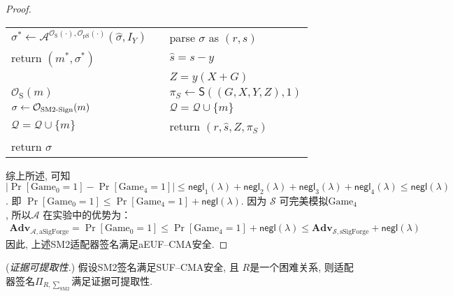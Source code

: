 \documentclass[review]{jcr}
\begin{document}
\begin{proof}
\begin{center}
{\begin{tabular}{lll}
$\sigma^*\leftarrow \mathcal{A}^{\mathcal{O}_{\text{S}}(\cdot),\mathcal{O}_{\text{pS}}(\cdot)}(\hat{\sigma},I_Y)$ &   &  parse $\sigma$ as $(r,s)$ \\

return $(m^*, \sigma^*)$ &   & $\hat{s}=s-y$  \\

 &   &  $Z=y(X+G)$ \\

$\mathcal{O}_{\text{S}}(m)$ &   &  $\pi_S\leftarrow \mathsf{S}((G,X,Y,Z),1)$ \\
\cline{1-1}

$\sigma\leftarrow \mathcal{O}_{\text{SM2\text{-}Sign}}(m)$ &   &  $\mathcal{Q}=\mathcal{Q}\cup \{m\}$ \\

$\mathcal{Q}=\mathcal{Q}\cup \{m\}$ &   &  return $(r,\hat{s},Z, \pi_S)$ \\

return $\sigma$ &   &   \\  
\end{tabular}}
\end{center}

综上所述, 可知$|\Pr[\text{Game}_0 = 1]-\Pr[\text{Game}_4 = 1]| \leq \mathsf{negl}_1(\lambda) + \mathsf{negl}_2(\lambda) + \mathsf{negl}_3(\lambda)+ \mathsf{negl}_4(\lambda) \leq \mathsf{negl}(\lambda)$. 即 $\Pr[\text{Game}_0 = 1]\leq \Pr[\text{Game}_4 = 1]+\mathsf{negl}(\lambda)$. 因为 $\mathcal{S}$ 可完美模拟$\text{Game}_4$, 所以$\mathcal{A}$ 在实验中的优势为：
\begin{equation*}
\begin{aligned}
\textbf{Adv}_{\mathcal{A},\text{aSigForge}} = \Pr[\text{Game}_0 = 1]\leq \Pr[\text{Game}_4=1]+\mathsf{negl}(\lambda)\leq \textbf{Adv}_{\mathcal{S},\text{sSigForge}}+\mathsf{negl}(\lambda)
\end{aligned}
\end{equation*}
因此, 上述SM2适配器签名满足aEUF–CMA安全.
\end{proof}


\begin{lemma}
(\emph{证据可提取性.}) 假设SM2签名满足SUF–CMA安全, 且 $R$是一个困难关系, 则适配器签名$\Pi_{R,\sum_{\text{SM2}}}$满足证据可提取性. 
\end{lemma}
\end{document}
